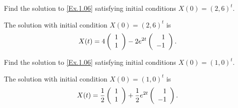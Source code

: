 \documentclass{ximera}
\begin{document}
\begin{exercise} \label{c6.1.06c}
Find the solution to \eqref{Ex.1.06} satisfying initial conditions
$X(0)=(2,6)^t$.

\begin{solution}
The solution with initial condition $X(0) = (2,6)^t$ is 
\[
X(t) = 4\left(\begin{array}{r} 1 \\ 1\end{array}\right) - 2e^{2t}\left(\begin{array}{r} 1 \\ -1\end{array}\right).
\]


\end{solution}
\end{exercise}
\begin{exercise} \label{c6.1.06d}
Find the solution to \eqref{Ex.1.06} satisfying initial conditions
$X(0)=(1,0)^t$.

\begin{solution}
The solution with initial condition $X(0) = (1,0)^t$ is
\[
X(t) = \frac{1}{2}\left(\begin{array}{r} 1 \\ 1\end{array}\right) + \frac{1}{2}e^{2t}\left(\begin{array}{r} 1 \\ -1\end{array}\right).
\]


\end{solution}
\end{exercise}
\end{document}
